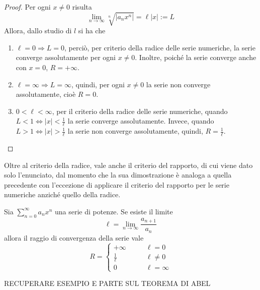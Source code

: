 \begin{proof}
    Per ogni $x \neq 0$ risulta
    \begin{equation}
        \lim_{n \to \infty}{\sqrt[n]{|a_n x^n|}} = \ell|x| := L
    \end{equation}
    Allora, dallo studio di $l$ si ha che
    \begin{enumerate}
        \item $\ell=0 \Rightarrow L=0$, perciò, per criterio della radice delle serie numeriche, la serie converge assolutamente per ogni $x \neq 0$. Inoltre, poiché la serie converge anche con $x=0$, $R=+\infty$.
        \item $\ell= \infty \Rightarrow L = \infty$, quindi, per ogni $x \neq 0$ la serie non converge assolutamente, cioè $R=0$.
        \item $0< \ell<\infty$, per il criterio della radice delle serie numeriche, quando $L<1 \iff |x|< \tfrac{1}{\ell}$ la serie converge assolutamente. Invece, quando $L>1 \iff |x|>\tfrac{1}{\ell}$ la serie non converge assolutamente, quindi, $R= \tfrac{1}{\ell}$.
    \end{enumerate}
\end{proof}
Oltre al criterio della radice, vale anche il criterio del rapporto, di cui viene dato solo l'enunciato, dal momento che la sua dimostrazione è analoga a quella precedente con l'eccezione di applicare il criterio del rapporto per le serie numeriche anziché quello della radice.
\begin{theorem}
    Sia $\sum\limits_{n=0}^{\infty}{a_n x^n}$ una serie di potenze. Se esiste il limite
    \begin{equation}
        \ell= \lim_{n \to \infty}{\frac{a_{n+1}}{a_n}}
    \end{equation}
    allora il raggio di convergenza della serie vale
    \begin{equation}
        R= \begin{cases}
        +\infty &\qquad \ell=0\\
        \frac{1}{\ell} &\qquad \ell \neq 0\\
        0 &\qquad \ell = \infty
        \end{cases}
    \end{equation}
\end{theorem}
\begin{example}
    RECUPERARE ESEMPIO E PARTE SUL TEOREMA DI ABEL
\end{example}

